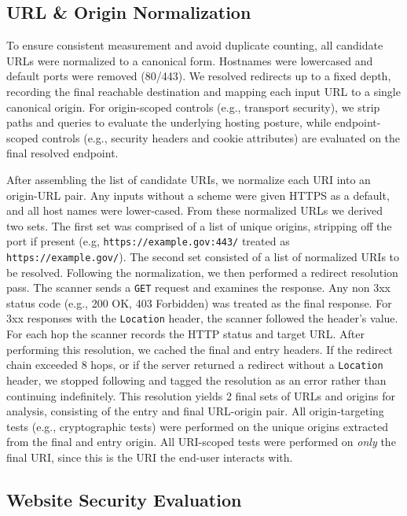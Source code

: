 \documentclass[conference]{IEEEtran}
\begin{document}
\subsection{URL \& Origin Normalization}

To ensure consistent measurement and avoid duplicate counting, 
all candidate URLs were normalized to a canonical form. Hostnames were
lowercased and default ports were removed (80/443). We resolved redirects up to a
fixed depth, recording the final reachable destination and mapping each input URL to a
single canonical origin. For origin-scoped controls (e.g.,
transport security), we strip paths and queries to evaluate the underlying
hosting posture, while endpoint-scoped controls (e.g., security headers and cookie attributes) are
evaluated on the final resolved endpoint.

After assembling the list of candidate URIs, we normalize each URI into an origin-URL pair. Any inputs 
without a scheme were given HTTPS as a default, and all host names were lower-cased. From these normalized 
URLs we derived two sets. The first set was comprised of a list of 
unique origins, stripping off the port if present (e.g, \texttt{https://example.gov:443/} treated as \texttt{https://example.gov/}). 
The second set consisted of a list of 
normalized URIs to be resolved. Following the normalization, we then performed a redirect resolution pass.
The scanner sends a \texttt{GET} request and examines the response.
Any non 3xx status code (e.g., 200 OK, 403 Forbidden) was treated as the final response. For 3xx responses with
the \texttt{Location} header, the scanner followed the header's value. For
each hop the scanner records the HTTP status and target URL. After performing this resolution, we 
cached the final and
entry headers. If the redirect chain exceeded 8 hops, 
or if the server returned a redirect without a \texttt{Location} header, we stopped following and tagged the resolution as
an error rather than continuing indefinitely. This resolution 
yields 2 final sets of URLs and origins for analysis, consisting of the entry and final URL-origin pair. 
All origin-targeting tests (e.g., cryptographic tests)  were performed on the unique origins extracted 
from the final and entry origin. All URI-scoped tests were performed on \emph{only} the
final URI, since this is the URI the end-user interacts with. 


\subsection{Website Security Evaluation}
\end{document}
